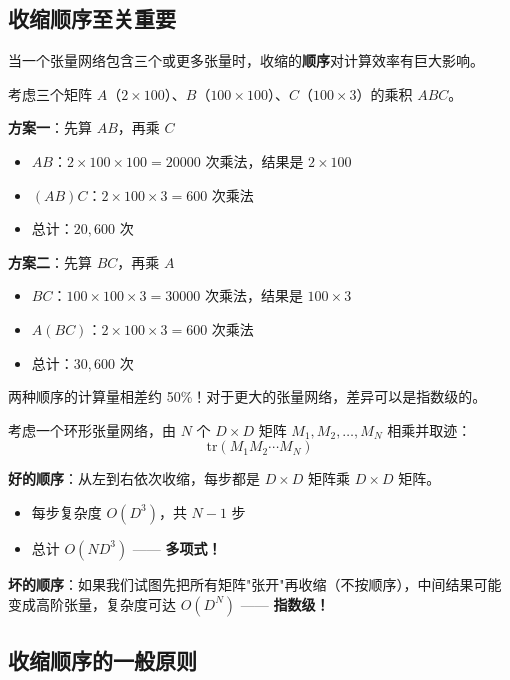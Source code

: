 \documentclass[12pt,a4paper]{ctexart}
\begin{document}
\subsection{收缩顺序至关重要}

当一个张量网络包含三个或更多张量时，收缩的\textbf{顺序}对计算效率有巨大影响。

\begin{examplebox}
考虑三个矩阵 $A$（$2\times 100$）、$B$（$100\times 100$）、$C$（$100\times 3$）的乘积 $ABC$。

\textbf{方案一}：先算 $AB$，再乘 $C$
\begin{itemize}
    \item $AB$：$2\times 100 \times 100 = 20000$ 次乘法，结果是 $2\times 100$
    \item $(AB)C$：$2\times 100 \times 3 = 600$ 次乘法
    \item 总计：$20{,}600$ 次
\end{itemize}

\textbf{方案二}：先算 $BC$，再乘 $A$
\begin{itemize}
    \item $BC$：$100\times 100 \times 3 = 30000$ 次乘法，结果是 $100\times 3$
    \item $A(BC)$：$2\times 100 \times 3 = 600$ 次乘法
    \item 总计：$30{,}600$ 次
\end{itemize}

两种顺序的计算量相差约 50\%！对于更大的张量网络，差异可以是指数级的。
\end{examplebox}

\begin{examplebox}[例13：收缩顺序的指数级差异]
考虑一个环形张量网络，由 $N$ 个 $D\times D$ 矩阵 $M_1, M_2, \ldots, M_N$ 相乘并取迹：
\[
\text{tr}(M_1 M_2 \cdots M_N)
\]

\textbf{好的顺序}：从左到右依次收缩，每步都是 $D\times D$ 矩阵乘 $D\times D$ 矩阵。
\begin{itemize}
    \item 每步复杂度 $O(D^3)$，共 $N-1$ 步
    \item 总计 $O(ND^3)$ —— \textbf{多项式！}
\end{itemize}

\textbf{坏的顺序}：如果我们试图先把所有矩阵"张开"再收缩（不按顺序），中间结果可能变成高阶张量，复杂度可达 $O(D^N)$ —— \textbf{指数级！}
\end{examplebox}

\subsection{收缩顺序的一般原则}
\end{document}
